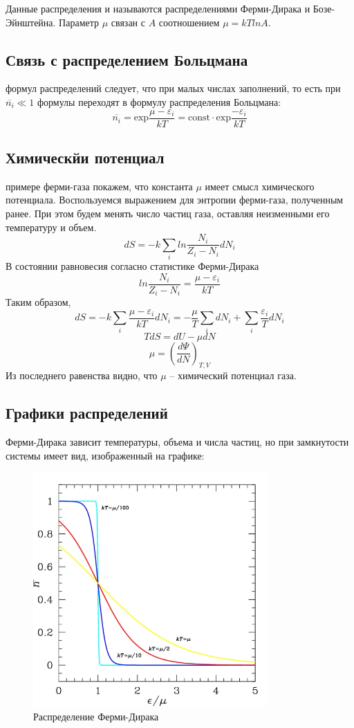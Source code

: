 \documentclass[a4paper,12pt]{article}
\begin{document}
Данные распределения и называются распределениями Ферми-Дирака и Бозе-Эйнштейна. Параметр $\mu$ связан с $A$ соотношением $\mu = kTlnA$.

\subsection*{Связь с распределением Больцмана}
\par\indent{} формул распределений следует, что при малых числах заполнений, то есть при $\overline{n_i} \ll 1$ формулы переходят в формулу распределения Больцмана: 
\[\overline{n_i} = \text{exp}\frac{\mu-\varepsilon_i}{kT} = \text{const}\cdot\text{exp}\frac{-\varepsilon_i}{kT}\]

\subsection*{Химическйи потенциал}
\par\indent{} примере ферми-газа покажем, что константа $\mu$ имеет смысл химического потенциала. Воспользуемся выражением для энтропии ферми-газа, полученным ранее. При этом будем менять число частиц газа, оставляя неизменными его температуру и объем.
\[dS = -k\sum_i{ln\frac{N_i}{Z_i-N_i}dN_i}\]
В состоянии равновесия согласно статистике Ферми-Дирака
\[ln\frac{N_i}{Z_i-N_i} = \frac{\mu-\varepsilon_i}{kT}\]
Таким образом,
\[dS = -k\sum_i\frac{\mu-\varepsilon_i}{kT}dN_i = -\frac{\mu}{T}\sum_idN_i + \sum_i\frac{\varepsilon_i}{T}dN_i\]
\[TdS = dU - \mu dN\]
\[\mu = (\frac{d\Psi}{dN})_{T,V}\]
Из последнего равенства видно, что $\mu$ -- химический потенциал газа.


\subsection*{Графики распределений}
\par\indent{} Ферми-Дирака зависит температуры, объема и числа частиц, но при замкнутости системы имеет вид, изображенный на графике:
\begin{figure}[h!]
\centering
\includegraphics[width=0.8\textwidth]{fgr.jpg}
\caption{Распределение Ферми-Дирака}
\end{figure}
\newpage
\end{document}
